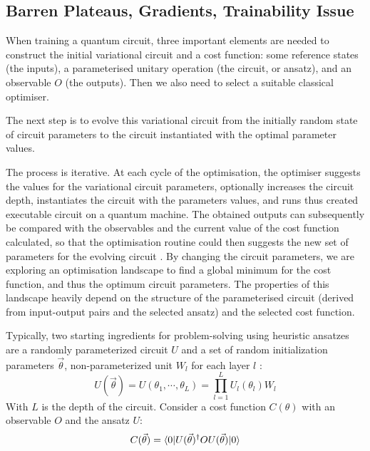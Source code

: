 \subsection{Barren Plateaus, Gradients, Trainability Issue} \label{Barren Plateaus section}

When training a quantum circuit, three important elements are needed to construct the initial variational circuit and a cost function: some reference states (the inputs), a parameterised unitary operation (the circuit, or ansatz), and an observable $O$ (the outputs). Then we also need to select a suitable classical optimiser.

The next step is to evolve this variational circuit from the initially random state of circuit parameters to the circuit instantiated with the optimal parameter values.

The process is iterative. At each cycle of the optimisation, the optimiser suggests the values for the variational circuit parameters, optionally increases the circuit depth, instantiates the circuit with the parameters values, and runs thus created executable circuit on a quantum machine. 
The obtained outputs can subsequently be compared with the observables and the current value of the cost function calculated, so that the optimisation routine could then suggests the new set of parameters for the evolving circuit \cite{cerezo2021variational}.
By changing the circuit parameters, we are exploring an optimisation landscape to find a global minimum for the cost function, and thus the optimum circuit parameters.
The properties of this landscape heavily depend on the structure of the parameterised circuit (derived from input-output pairs and the selected ansatz) and the selected cost function.

Typically, two starting ingredients for problem-solving using heuristic ansatzes are a randomly parameterized circuit $U$ and a set of random initialization parameters $\vec{\theta}$, non-parameterized unit $W_l$ for each layer $l$ \cite{mccleanBarrenPlateausQuantum2018}:
\begin{equation}\label{Parameterized Circuit}
    U(\vec{\theta})
    = U(\theta_1, \cdots, \theta_L)
    = \prod_{l=1}^L U_l(\theta_l)W_l
\end{equation}
With $L$ is the depth of the circuit. Consider a cost function $C(\theta)$ with an observable $O$ and the ansatz $U$:
\begin{equation}
    C(\vec{\theta})
    = \bra{0} U(\vec{\theta})^\dagger OU(\vec{\theta}) \ket{0}
\end{equation}

